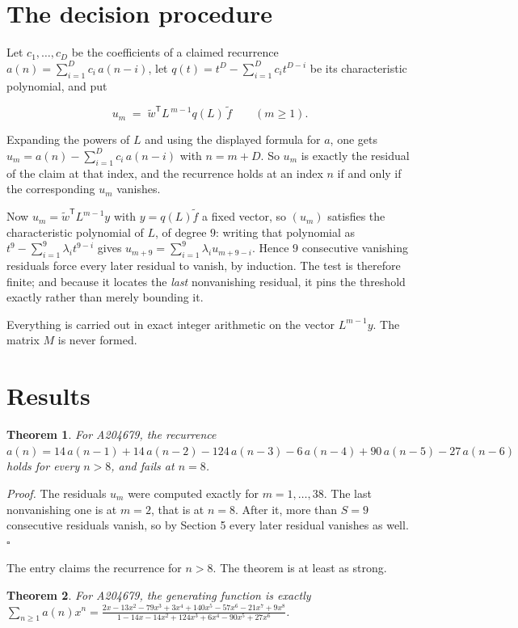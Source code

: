 \documentclass[11pt]{article}
\newtheorem{theorem}{Theorem}
\theoremstyle{definition}
\begin{document}
\section{The decision procedure}

Let $c_1,\dots,c_D$ be the coefficients of a claimed recurrence $a(n) = \sum_{i=1}^{D} c_i\,a(n-i)$, let $q(t) = t^{D} - \sum_{i=1}^{D} c_i t^{D-i}$ be its characteristic polynomial, and put

\[u_m \;=\; \tilde w^{\mathsf T} L^{\,m-1} q(L)\,\tilde f \qquad (m \ge 1).\]

Expanding the powers of $L$ and using the displayed formula for $a$, one gets $u_m = a(n) - \sum_{i=1}^{D} c_i\,a(n-i)$ with $n = m + D$. So $u_m$ is exactly the residual of the claim at that index, and the recurrence holds at an index $n$ if and only if the corresponding $u_m$ vanishes.

Now $u_m = \tilde w^{\mathsf T} L^{m-1} y$ with $y = q(L)\tilde f$ a fixed vector, so $(u_m)$ satisfies the characteristic polynomial of $L$, of degree $9$: writing that polynomial as $t^{9} - \sum_{i=1}^{9} \lambda_i t^{9-i}$ gives $u_{m+9} = \sum_{i=1}^{9} \lambda_i u_{m+9-i}$. Hence $9$ consecutive vanishing residuals force every later residual to vanish, by induction. The test is therefore finite; and because it locates the {\itshape last} nonvanishing residual, it pins the threshold exactly rather than merely bounding it.

Everything is carried out in exact integer arithmetic on the vector $L^{m-1}y$. The matrix $M$ is never formed.

\section{Results}

\begin{theorem} For A204679, the recurrence $a(n) = 14\,a(n-1) + 14\,a(n-2) - 124\,a(n-3) - 6\,a(n-4) + 90\,a(n-5) - 27\,a(n-6)$ holds for every $n > 8$, and fails at $n = 8$.\end{theorem}

{\itshape Proof.} The residuals $u_m$ were computed exactly for $m = 1,\dots,38$. The last nonvanishing one is at $m = 2$, that is at $n = 8$. After it, more than $S = 9$ consecutive residuals vanish, so by Section 5 every later residual vanishes as well. $\square$

The entry claims the recurrence for $n > 8$. The theorem is at least as strong.

\begin{theorem} For A204679, the generating function is exactly $\sum_{n\ge 1} a(n)x^n = \frac{2x - 13x^{2} - 79x^{3} + 3x^{4} + 140x^{5} - 57x^{6} - 21x^{7} + 9x^{8}}{1 - 14x - 14x^{2} + 124x^{3} + 6x^{4} - 90x^{5} + 27x^{6}}$.\end{theorem}
\end{document}
